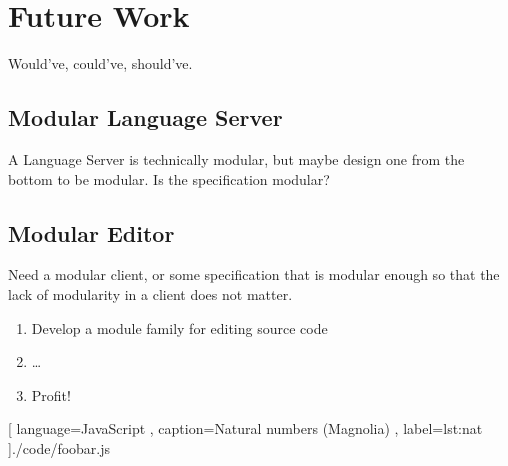 \chapter{Future Work}

Would've, could've, should've.

\section{Modular Language Server}

A Language Server is technically modular, but maybe design one from the bottom
to be modular. Is the specification modular?

\section{Modular Editor}

Need a modular client, or some specification that is modular enough so that the
lack of modularity in a client does not matter.

\begin{enumerate}
  \item Develop a module family for editing source code
  \item \dots
  \item Profit!
\end{enumerate}



[ language=JavaScript
, caption={Natural numbers (Magnolia)}
, label=lst:nat
]{./code/foobar.js}

